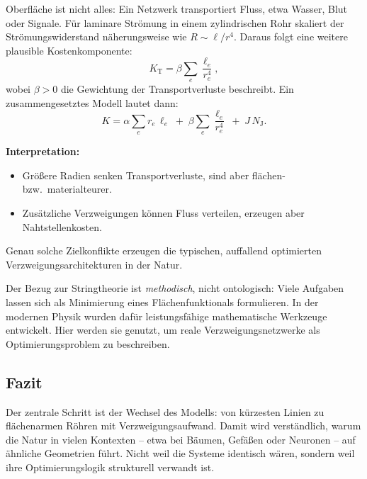 Oberfläche ist nicht alles: Ein Netzwerk transportiert Fluss, etwa Wasser, Blut oder Signale.
Für laminare Strömung in einem zylindrischen Rohr skaliert der Strömungswiderstand näherungsweise wie
$R \sim \ell/r^4$.
Daraus folgt eine weitere plausible Kostenkomponente:
\begin{equation}
	K_{\text{T}} = \beta \sum_e \frac{\ell_e}{r_e^4},
	\label{eq:transport_cost}
\end{equation}
wobei $\beta>0$ die Gewichtung der Transportverluste beschreibt.
Ein zusammengesetztes Modell lautet dann:
\begin{equation}
	K = \alpha \sum_e r_e\,\ell_e \;+\;
	\beta \sum_e \frac{\ell_e}{r_e^4}
	\;+\; J\,N_{\text{J}}.
	\label{eq:full_cost}
\end{equation}

\textbf{Interpretation:}
\begin{itemize}
	\item Größere Radien senken Transportverluste, sind aber flächen- bzw.\ materialteurer.
	\item Zusätzliche Verzweigungen können Fluss verteilen, erzeugen aber Nahtstellenkosten.
\end{itemize}

Genau solche Zielkonflikte erzeugen die typischen, auffallend optimierten Verzweigungsarchitekturen in der Natur.
\begin{DidacticBox}
	\label{box:stringtheorie-flaechenoptimierung}
	Der Bezug zur Stringtheorie ist \emph{methodisch}, nicht ontologisch:
	Viele Aufgaben lassen sich als Minimierung eines Flächenfunktionals formulieren.
	In der modernen Physik wurden dafür leistungsfähige mathematische Werkzeuge entwickelt.
	Hier werden sie genutzt, um reale Verzweigungsnetzwerke als Optimierungsproblem zu beschreiben.
\end{DidacticBox}

\subsection{Fazit}

Der zentrale Schritt ist der Wechsel des Modells:
von \glqq kürzesten Linien\grqq{} zu \glqq flächenarmen Röhren mit Verzweigungsaufwand\grqq{}.
Damit wird verständlich, warum die Natur in vielen Kontexten
-- etwa bei Bäumen, Gefäßen oder Neuronen --
auf ähnliche Geometrien führt.
Nicht weil die Systeme identisch wären, sondern weil ihre Optimierungslogik strukturell verwandt ist.

